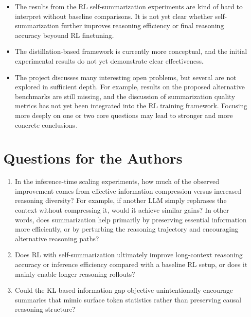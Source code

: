 \documentclass{article}
\begin{document}
\begin{itemize}
    \item The results from the RL self-summarization experiments are kind of hard to interpret without baseline comparisons. It is not yet clear whether self-summarization further improves reasoning efficiency or final reasoning accuracy beyound RL finetuning.
    
    \item The distillation-based framework is currently more conceptual, and the initial experimental results do not yet demonstrate clear effectiveness.

    \item The project discusses many interesting open problems, but several are not explored in sufficient depth. For example, results on the proposed alternative benchmarks are still missing, and the discussion of summarization quality metrics has not yet been integrated into the RL training framework. Focusing more deeply on one or two core questions may lead to stronger and more concrete conclusions.
\end{itemize}

\section{Questions for the Authors}

\begin{enumerate}
    \item In the inference-time scaling experiments, how much of the observed improvement comes from effective information compression versus increased reasoning diversity? For example, if another LLM simply rephrases the context without compressing it, would it achieve similar gains? In other words, does summarization help primarily by preserving essential information more efficiently, or by perturbing the reasoning trajectory and encouraging alternative reasoning paths?
    
    \item Does RL with self-summarization ultimately improve long-context reasoning accuracy or inference efficiency compared with a baseline RL setup, or does it mainly enable longer reasoning rollouts?
    
    \item Could the KL-based information gap objective unintentionally encourage summaries that mimic surface token statistics rather than preserving causal reasoning structure?
\end{enumerate}
\end{document}
